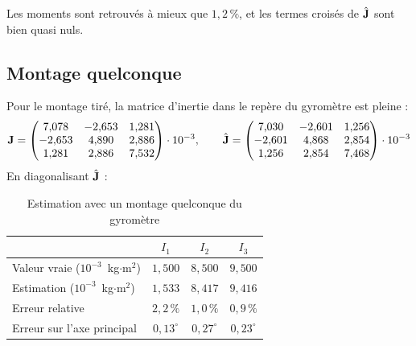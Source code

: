 Les moments sont retrouvés à mieux que $1{,}2\,\%$, et les termes
croisés de $\hat{\mathbf{J}}$ sont bien quasi nuls.

\subsection{Montage quelconque}

Pour le montage tiré, la matrice d'inertie dans le repère du gyromètre
est pleine :
\[
    \mathbf{J} = \begin{pmatrix}
        7{,}078 & -2{,}653 & 1{,}281\\
        -2{,}653 & 4{,}890 & 2{,}886\\
        1{,}281 & 2{,}886 & 7{,}532
    \end{pmatrix}\cdot 10^{-3},
    \qquad
    \hat{\mathbf{J}} = \begin{pmatrix}
        7{,}030 & -2{,}601 & 1{,}256\\
        -2{,}601 & 4{,}868 & 2{,}854\\
        1{,}256 & 2{,}854 & 7{,}468
    \end{pmatrix}\cdot 10^{-3}
\]
En diagonalisant $\hat{\mathbf{J}}$ :

\begin{table}[H]
    \centering
    \begin{tabular}{lccc}
        \toprule
        & $I_1$ & $I_2$ & $I_3$ \\
        \midrule
        Valeur vraie ($10^{-3}$~kg$\cdot$m$^2$) & $1{,}500$ & $8{,}500$ & $9{,}500$ \\
        Estimation ($10^{-3}$~kg$\cdot$m$^2$) & $1{,}533$ & $8{,}417$ & $9{,}416$ \\
        Erreur relative & $2{,}2\,\%$ & $1{,}0\,\%$ & $0{,}9\,\%$ \\
        Erreur sur l'axe principal & $0{,}13^\circ$ & $0{,}27^\circ$ & $0{,}23^\circ$ \\
        \bottomrule
    \end{tabular}
    \caption{Estimation avec un montage quelconque du gyromètre}
    \label{tab-estimation-quelconque}
\end{table}